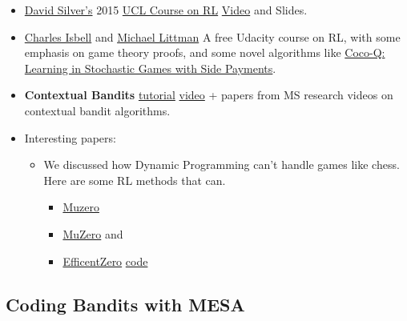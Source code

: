 \documentclass[
  letterpaper,
  DIV=11,
  numbers=noendperiod,
  oneside]{scrartcl}
\providecommand{\tightlist}{%
  \setlength{\itemsep}{0pt}\setlength{\parskip}{0pt}}\usepackage{longtable,booktabs,array}
\theoremstyle{definition}
\theoremstyle{remark}
\begin{document}
\begin{itemize}
\tightlist
\item
  \href{http://www0.cs.ucl.ac.uk/staff/d.silver/web/Home.html}{David
  Silver's} 2015 \href{https://www.davidsilver.uk/teaching/}{UCL Course
  on RL} \href{https://www.youtube.com/watch?v=2pWv7GOvuf0}{Video} and
  Slides.
\item
  \href{https://faculty.cc.gatech.edu/~isbell/pubs/}{Charles Isbell} and
  \href{https://www.littmania.com/}{Michael Littman} A free Udacity
  course on RL, with some emphasis on game theory proofs, and some novel
  algorithms like
  \href{http://proceedings.mlr.press/v28/sodomka13.pdf}{Coco-Q: Learning
  in Stochastic Games with Side Payments}.
\item
  \textbf{Contextual Bandits} \href{https://hunch.net/~rwil/}{tutorial}
  \href{https://vimeo.com/240429210}{video} + papers from MS research
  videos on contextual bandit algorithms.
\item
  Interesting papers:

  \begin{itemize}
  \tightlist
  \item
    We discussed how Dynamic Programming can't handle games like chess.
    Here are some RL methods that can.

    \begin{itemize}
    \tightlist
    \item
      \href{https://www.nature.com/articles/s41586-020-03051-4.epdf?sharing_token=kTk-xTZpQOF8Ym8nTQK6EdRgN0jAjWel9jnR3ZoTv0PMSWGj38iNIyNOw_ooNp2BvzZ4nIcedo7GEXD7UmLqb0M_V_fop31mMY9VBBLNmGbm0K9jETKkZnJ9SgJ8Rwhp3ySvLuTcUr888puIYbngQ0fiMf45ZGDAQ7fUI66-u7Y\%3D}{Muzero}
    \item
      \href{https://arxiv.org/abs/2202.06626}{MuZero} and
    \item
      \href{https://arxiv.org/abs/2111.00210}{EfficentZero}
      \href{https://github.com/YeWR/EfficientZero}{code}
    \end{itemize}
  \end{itemize}
\end{itemize}

\subsection{Coding Bandits with MESA}\label{coding-bandits-with-mesa}
\end{document}
